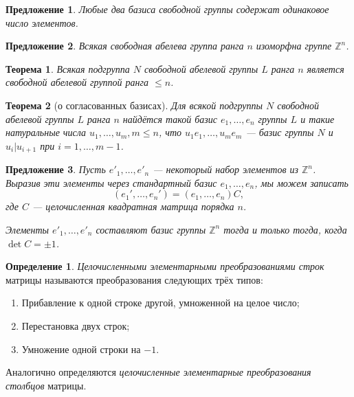 \documentclass[a4paper]{article}
\theoremstyle{plain}
\newtheorem*{theorem}{Теорема}
\newtheorem{proposal}{Предложение}
\theoremstyle{definition}
\newtheorem{definition}{Определение}
\numberwithin{definition}{section}
\numberwithin{proposal}{section}
\begin{document}
\begin{proposal}
Любые два базиса свободной группы содержат одинаковое число элементов.
\end{proposal}

\begin{proposal}
Всякая свободная абелева группа ранга \(n\) изоморфна группе \(\mathbb{Z}^n\).
\end{proposal}

\begin{theorem}
Всякая подгруппа \(N\) свободной абелевой группы \(L\) ранга \(n\) является свободной абелевой группой ранга \(\leqslant n\).
\end{theorem}

\begin{theorem}[о согласованных базисах]
Для всякой подгруппы \(N\) свободной абелевой группы \(L\) ранга \(n\) найдётся такой базис \(e_1, \dots, e_n\) группы \(L\) и такие натуральные числа \(u_1, \dots, u_m, m \leqslant n\), что \(u_1e_1, \dots, u_me_m\) --- базис группы \(N\) и \(u_i | u_{i+1}\) при \(i = 1, \dots, m-1\).
\end{theorem}

\begin{proposal}
Пусть \(e'_1, \dots, e'_n\) --- некоторый набор элементов из \(\mathbb{Z}^n\). Выразив эти элементы через стандартный базис \(e_1, \dots, e_n\), мы можем записать
\begin{equation*}
	(e_1', \dots, e_n') = (e_1, \dots, e_n)C,
\end{equation*}
где \(C\) --- целочисленная квадратная матрица порядка \(n\).

Элементы \(e'_1, \dots, e'_n\) составляют базис группы \(\mathbb{Z}^n\) тогда и только тогда, когда \(\det C = \pm 1\).
\end{proposal}

\begin{definition}
\emph{Целочисленными элементарными преобразованиями строк} матрицы называются преобразования следующих трёх типов:
\begin{enumerate}
	\item Прибавление к одной строке другой, умноженной на целое число;
	\item Перестановка двух строк;
	\item Умножение одной строки на \(-1\).
\end{enumerate}
Аналогично определяются \emph{целочисленные элементарные преобразования столбцов} матрицы.
\end{definition}
\end{document}
